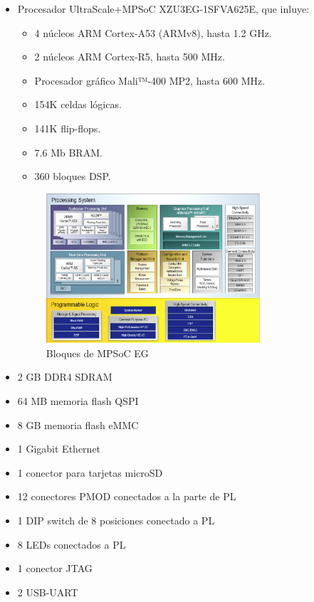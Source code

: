\begin{itemize}
  \item Procesador UltraScale+\texttrademark MPSoC XZU3EG-1SFVA625E, que inluye:
  \begin{itemize}
    \item 4 núcleos ARM Cortex-A53 (ARMv8), hasta 1.2 GHz.
    \item 2 núcleos ARM Cortex-R5, hasta 500 MHz.
    \item Procesador gráfico Mali™-400 MP2, hasta 600 MHz.
    \item 154K celdas lógicas.
    \item 141K flip-flops.
    \item 7.6 Mb \acrshort{BRAM}.
    \item 360 bloques \acrshort{DSP}.
    \end{itemize}

    \begin{figure}[h]
    	\centering
    	\includegraphics[width=0.75\textwidth]{recursos/mpsoc_arch.png}
    	\caption{Bloques de MPSoC EG}
    	\label{fig:mpsoc_arch}
    \end{figure}

  \item 2 GB \acrshort{DDR}4 \acrshort{SDRAM}
  \item 64 MB memoria flash \acrshort{QSPI}
  \item 8 GB memoria flash \acrshort{eMMC}
  \item 1 Gigabit Ethernet
  \item 1 conector para tarjetas microSD
  \item 12 conectores \acrshort{PMOD} conectados a la parte de \acrshort{PL}
  \item 1 \acrshort{DIP} switch de 8 posiciones conectado a \acrshort{PL}
  \item 8 LEDs conectados a \acrshort{PL}
  \item 1 conector \acrshort{JTAG}
  \item 2 \acrshort{USB}-\acrshort{UART}
\end{itemize}

